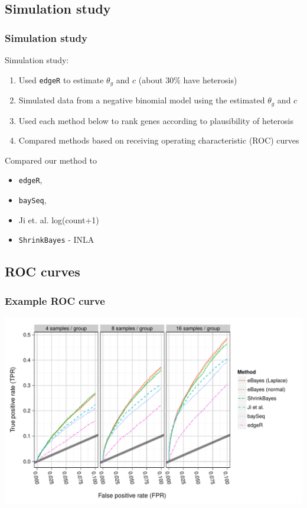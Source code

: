 \documentclass[handout]{beamer}\usepackage[]{graphicx}\usepackage[]{color}
\begin{document}
\subsection{Simulation study}
\begin{frame}
\frametitle{Simulation study}

Simulation study:
\begin{enumerate}[<+->]
\item Used {\tt edgeR} to estimate $\theta_g$ and $c$ (about 30\% have heterosis)
\item Simulated data from a negative binomial model using the estimated $\theta_g$ and $c$
\item Used each method below to rank genes according to plausibility of heterosis
\item Compared methods based on receiving operating characteristic (ROC) curves
\end{enumerate}

\vspace{0.2in} \pause

Compared our method to 
\begin{itemize}
\item {\tt edgeR}, 
\item {\tt baySeq}, 
\item Ji et. al. log(count+1)
\item {\tt ShrinkBayes} - INLA
\end{itemize}

\end{frame}



\subsection{ROC curves}
\begin{frame}
\frametitle{Example ROC curve}
\begin{center}
\includegraphics{exampleROC0_1}
\end{center}
\end{frame}
\end{document}
